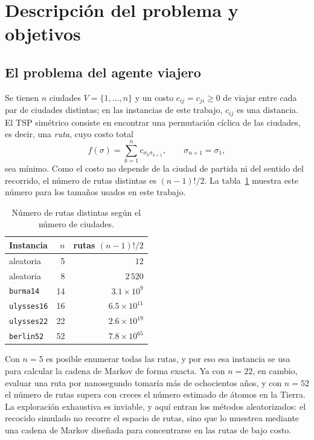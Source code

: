 
\section{Descripción del problema y objetivos}
\label{sec:problema}

\subsection{El problema del agente viajero}
\label{subsec:tsp}

Se tienen \(n\) ciudades \(V=\{1,\ldots,n\}\) y un costo
\(c_{ij}=c_{ji}\ge0\) de viajar entre cada par de ciudades distintas;
en las instancias de este trabajo, \(c_{ij}\) es una distancia. El TSP
simétrico consiste en encontrar una permutación cíclica de las ciudades,
es decir, una \emph{ruta}, cuyo costo total
\[
f(\sigma)=\sum_{k=1}^{n}c_{\sigma_k\sigma_{k+1}},\qquad
\sigma_{n+1}=\sigma_1,
\]
sea mínimo. Como el costo no depende de la ciudad de partida ni del
sentido del recorrido, el número de rutas distintas es
\((n-1)!/2\). La tabla~\ref{tab:explosion} muestra este número para los
tamaños usados en este trabajo.

\begin{table}[H]
\centering
\small
\begin{tabular}{@{}lrr@{}}
\toprule
Instancia & \(n\) & rutas \((n-1)!/2\) \\
\midrule
aleatoria          &  5 & \(12\) \\
aleatoria          &  8 & \(2\,520\) \\
\texttt{burma14}   & 14 & \(3.1\times10^{9}\) \\
\texttt{ulysses16} & 16 & \(6.5\times10^{11}\) \\
\texttt{ulysses22} & 22 & \(2.6\times10^{19}\) \\
\texttt{berlin52}  & 52 & \(7.8\times10^{65}\) \\
\bottomrule
\end{tabular}
\caption{Número de rutas distintas según el número de ciudades.}
\label{tab:explosion}
\end{table}

Con \(n=5\) es posible enumerar todas las rutas, y por eso esa instancia
se usa para calcular la cadena de Markov de forma exacta. Ya con
\(n=22\), en cambio, evaluar una ruta por nanosegundo tomaría más de
ochocientos años, y con \(n=52\) el número de rutas supera con creces
el número estimado de átomos en la Tierra. La exploración exhaustiva es
inviable, y aquí entran los métodos aleatorizados: el recocido simulado
no recorre el espacio de rutas, sino que lo muestrea mediante una
cadena de Markov diseñada para concentrarse en las rutas de bajo costo.

